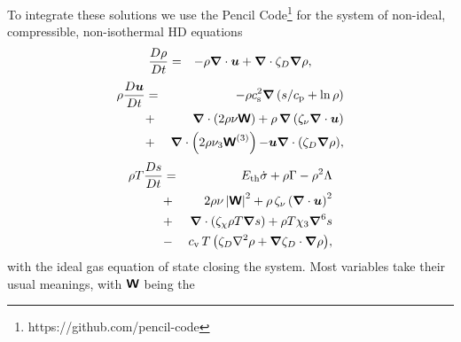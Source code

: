 \documentclass[fleqn,usenatbib]{mnras}
\newcommand\ESK{E_{\rm kin}}
\newcommand\EST{E_{\rm th}}
\newcommand{\vect}[1]{{{\mbox{\boldmath $#1$}}}}%
\begin{document}
 To integrate these solutions we use the Pencil
 Code\footnote{https://github.com/pencil-code} \citep{Pencil-JOSS} for
 the system of non-ideal, compressible, non-isothermal HD equations
  \begin{eqnarray}
  \label{eq:mass}
    \frac{D\rho}{Dt} &=& 
    -\rho \vect\nabla \cdot \vect{u}
    +\vect\nabla \cdot\zeta_D\vect\nabla\rho,
  \end{eqnarray}
  \begin{eqnarray}
  \label{eq:mom}
    \rho\frac{D\vect{u}}{Dt} &=& 
    -\rho c_{\rm s}^2\vect\nabla\left({s}/{c_{\rm p}}+\ln\rho\right)
    \nonumber\\
    &+&\vect\nabla\cdot \left(2\rho\nu{\mathbfss W}\right)
    +\rho\,\vect\nabla\left(\zeta_{\nu}\vect\nabla \cdot \vect{u} \right)
    \nonumber\\
    &+&\vect\nabla\cdot \left(2\rho\nu_3{\mathbfss W}^{(3)}\right)
  {-\vect u\vect{\nabla}\cdot\left(\zeta_D\vect{\nabla}\rho\right)},
  \end{eqnarray}
  \begin{eqnarray}
  \label{eq:ent}
    \rho T\frac{D s}{Dt} &=&
     \EST\dot\sigma +\rho\Gamma
    -\rho^2\Lambda %
    \nonumber\\
    &+&2 \rho \nu\left|{\mathbfss W}\right|^{2}
    +\rho\,\zeta_{\nu}\left(\vect\nabla \cdot \vect{u} \right)^2
    \nonumber\\
    &+&\vect\nabla\cdot\left(\zeta_\chi\rho T\vect\nabla s\right)
    +\rho T\chi_3\vect\nabla^6 s
    \nonumber\\
    &-& {c_{\rm{v}}\,T \left(
    \zeta_D\nabla^2\rho + \vect\nabla\zeta_D\cdot\vect\nabla\rho\right)},
  \end{eqnarray}
 with the ideal gas equation of state closing the system.
 Most variables take their usual meanings, with ${\textbf{\textsf{W}}}$ being the 
\end{document}

